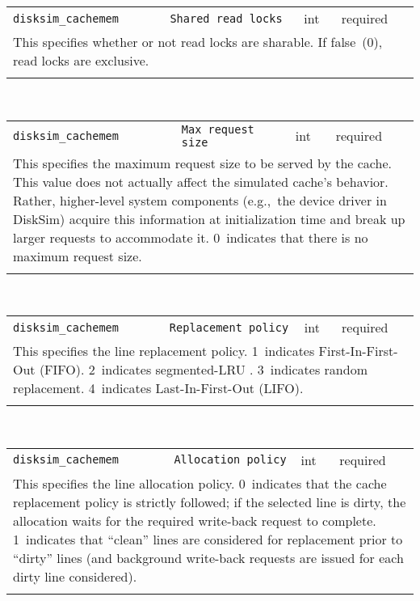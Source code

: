\noindent 
\begin{tabular}{|p{1.5in}|p{3.5in}|p{0.5in}|p{0.5in}|}
\cline{1-4}
\texttt{disksim\_cachemem} & \texttt{Shared read locks} & int & required \\ 
\cline{1-4}
\multicolumn{4}{|p{6in}|}{
This specifies whether or not read locks are sharable. If false~(0), read
locks are exclusive.
}\\ 
\cline{1-4}
\multicolumn{4}{p{5in}}{}\\
\end{tabular}\\ 
\noindent 
\begin{tabular}{|p{1.5in}|p{3.5in}|p{0.5in}|p{0.5in}|}
\cline{1-4}
\texttt{disksim\_cachemem} & \texttt{Max request size} & int & required \\ 
\cline{1-4}
\multicolumn{4}{|p{6in}|}{
This specifies the maximum request size to be served by the cache. This
value does not actually affect the simulated cache's behavior.
Rather, higher-level system components (e.g.,~the device driver in
DiskSim) acquire this information at initialization time and break up
larger requests to accommodate it. 0~indicates that there is no
maximum request size.
}\\ 
\cline{1-4}
\multicolumn{4}{p{5in}}{}\\
\end{tabular}\\ 
\noindent 
\begin{tabular}{|p{1.5in}|p{3.5in}|p{0.5in}|p{0.5in}|}
\cline{1-4}
\texttt{disksim\_cachemem} & \texttt{Replacement policy} & int & required \\ 
\cline{1-4}
\multicolumn{4}{|p{6in}|}{
This specifies the line replacement policy.
1~indicates First-In-First-Out (FIFO).
2~indicates segmented-LRU \cite{Karedla94}.
3~indicates random replacement.
4~indicates Last-In-First-Out (LIFO).
}\\ 
\cline{1-4}
\multicolumn{4}{p{5in}}{}\\
\end{tabular}\\ 
\noindent 
\begin{tabular}{|p{1.5in}|p{3.5in}|p{0.5in}|p{0.5in}|}
\cline{1-4}
\texttt{disksim\_cachemem} & \texttt{Allocation policy} & int & required \\ 
\cline{1-4}
\multicolumn{4}{|p{6in}|}{
This specifies the line allocation policy.
0~indicates that the cache replacement policy is strictly followed; if
the selected line is dirty, the allocation waits for the required
write-back request to complete.
1~indicates that ``clean'' lines are considered for replacement prior
to ``dirty'' lines (and background write-back requests are issued for
each dirty line considered).
}\\ 
\cline{1-4}
\multicolumn{4}{p{5in}}{}\\
\end{tabular}\\ 
